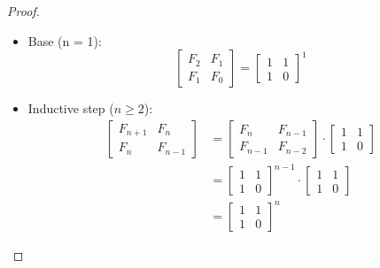 \documentclass[11pt,toc=twocol]{elegantbook}
\begin{document}
\begin{proof}
    \begin{itemize}
        \item Base (n = 1):
        $$
\left[\begin{array}{ll}
F_{2} & F_{1} \\
F_{1} & F_{0}
\end{array}\right]=\left[\begin{array}{ll}
1 & 1 \\
1 & 0
\end{array}\right]^{1}
$$
        \item Inductive step ($n\geq2$):
        $$
\begin{aligned}
{\left[\begin{array}{cc}
F_{n+1} & F_{n} \\
F_{n} & F_{n-1}
\end{array}\right] } &=\left[\begin{array}{cc}
F_{n} & F_{n-1} \\
F_{n-1} & F_{n-2}
\end{array}\right] \cdot\left[\begin{array}{ll}
1 & 1 \\
1 & 0
\end{array}\right] \\
&=\left[\begin{array}{ll}
1 & 1 \\
1 & 0
\end{array}\right]^{n-1} \cdot\left[\begin{array}{ll}
1 & 1 \\
1 & 0
\end{array}\right] \\
&=\left[\begin{array}{ll}
1 & 1 \\
1 & 0
\end{array}\right]^{n}
\end{aligned}
$$
    \end{itemize}
\end{proof}
\end{document}
